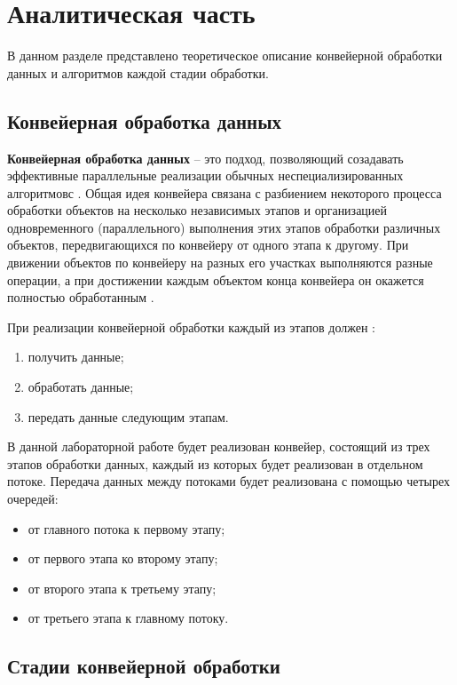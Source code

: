 \chapter{Аналитическая часть}

В данном разделе представлено теоретическое описание конвейерной обработки
данных и алгоритмов каждой стадии обработки.

\section{Конвейерная обработка данных}

\textbf{Конвейерная обработка данных} -- это подход, позволяющий созадавать
эффективные параллельные реализации обычных неспециализированных алгоритмовс
\cite{Pogorelov}. Общая идея конвейера связана с разбиением некоторого
процесса обработки объектов на несколько независимых этапов и организацией
одновременного (параллельного) выполнения этих этапов обработки различных
объектов, передвигающихся по конвейеру от одного этапа к другому.  При движении
объектов по конвейеру на разных его участках выполняются разные операции, а при
достижении каждым объектом конца конвейера он окажется полностью обработанным
\cite{Bogoslovskiy}.

При реализации конвейерной обработки каждый из этапов должен \cite{Pogorelov}:

\begin{enumerate}
    \item получить данные;
    \item обработать данные;
    \item передать данные следующим этапам.
\end{enumerate}

В данной лабораторной работе будет реализован конвейер, состоящий из трех
этапов обработки данных, каждый из которых будет реализован в отдельном потоке.
Передача данных между потоками будет реализована с помощью четырех очередей:
\begin{itemize}
    \item от главного потока к первому этапу;
    \item от первого этапа ко второму этапу;
    \item от второго этапа к третьему этапу;
    \item от третьего этапа к главному потоку.
\end{itemize}

\section{Стадии конвейерной обработки}

